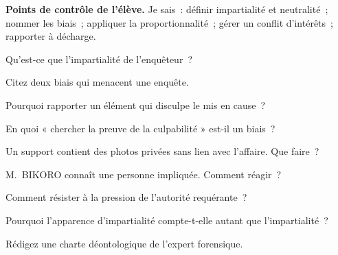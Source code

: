 \begin{boxinfo}
\textbf{Points de contrôle de l'élève.} Je sais~: définir impartialité et
neutralité~; nommer les biais~; appliquer la proportionnalité~; gérer un
conflit d'intérêts~; rapporter à décharge.
\end{boxinfo}

\bigskip

\begin{boxexo}[title={\ding{45}\quad Exercice~3.1. Impartialité \niveaubase}]
Qu'est-ce que l'impartialité de l'enquêteur~?
\end{boxexo}

\begin{boxexo}[title={\ding{45}\quad Exercice~3.2. Biais \niveaubase}]
Citez deux biais qui menacent une enquête.
\end{boxexo}

\begin{boxexo}[title={\ding{45}\quad Exercice~3.3. À décharge \niveaubase}]
Pourquoi rapporter un élément qui disculpe le mis en cause~?
\end{boxexo}

\begin{boxexo}[title={\ding{45}\quad Exercice~3.4. Confirmation \niveaumoyen}]
En quoi « chercher la preuve de la culpabilité » est-il un biais~?
\end{boxexo}

\begin{boxexo}[title={\ding{45}\quad Exercice~3.5. Proportionnalité \niveaumoyen}]
Un support contient des photos privées sans lien avec l'affaire. Que faire~?
\end{boxexo}

\begin{boxexo}[title={\ding{45}\quad Exercice~3.6. Conflit \niveaumoyen}]
M.~BIKORO connaît une personne impliquée. Comment réagir~?
\end{boxexo}

\begin{boxexo}[title={\ding{45}\quad Exercice~3.7. Pression \niveaumoyen}]
Comment résister à la pression de l'autorité requérante~?
\end{boxexo}

\begin{boxexo}[title={\ding{45}\quad Exercice~3.8. Apparence \niveaumoyen}]
Pourquoi l'apparence d'impartialité compte-t-elle autant que l'impartialité~?
\end{boxexo}

\begin{boxexo}[title={\ding{45}\quad Exercice~3.9. Charte \niveauexpert}]
Rédigez une charte déontologique de l'expert forensique.
\end{boxexo}

